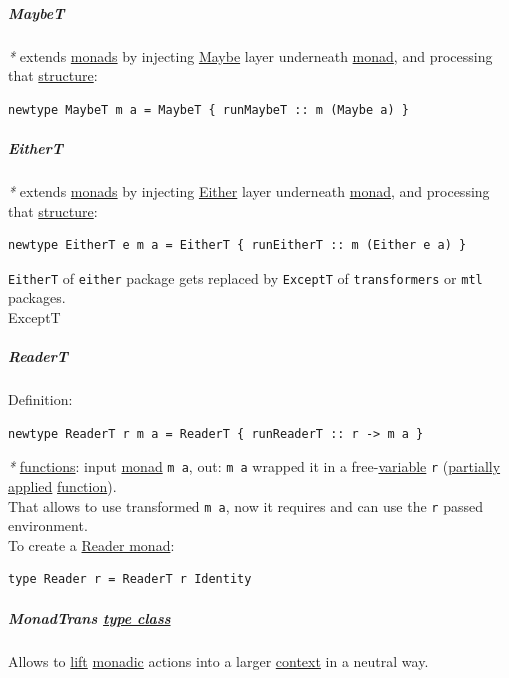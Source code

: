 \documentclass[a4paper,14pt,oneside]{book}
\begin{document}
{\subparagraph{\label{orge64d126}MaybeT}
\label{sec:orge930cc7}
\emph{*} extends \hyperref[org7e5e6f7]{monads} by injecting \hyperref[orgdc2637a]{Maybe} layer underneath \hyperref[org90c21ab]{monad}, and processing that \hyperref[org080800e]{structure}:\\
\begin{verbatim}
newtype MaybeT m a = MaybeT { runMaybeT :: m (Maybe a) }
\end{verbatim}

\subparagraph{\label{orge39884b}EitherT}
\label{sec:orga76383f}
\emph{*} extends \hyperref[org7e5e6f7]{monads} by injecting \hyperref[org25321ee]{Either} layer underneath \hyperref[org90c21ab]{monad}, and processing that \hyperref[org080800e]{structure}:\\

\begin{verbatim}
newtype EitherT e m a = EitherT { runEitherT :: m (Either e a) }
\end{verbatim}

\texttt{EitherT} of \texttt{either} package gets replaced by \texttt{ExceptT} of \texttt{transformers} or \texttt{mtl} packages.\\

\subsubparagraph{\emph{*}}
\label{sec:orga2c3408}
\label{org0832c3b}ExceptT\\

\subparagraph{\label{orgd2e8236}ReaderT}
\label{sec:org79cb9db}
Definition:\\
\begin{verbatim}
newtype ReaderT r m a = ReaderT { runReaderT :: r -> m a }
\end{verbatim}

\emph{*} \hyperref[orgf33f5fb]{functions}: input \hyperref[org90c21ab]{monad} \texttt{m a}, out: \texttt{m a} wrapped it in a free-\hyperref[org82b2aef]{variable} \texttt{r} (\hyperref[orgae8108f]{partially applied} \hyperref[org6a60524]{function}).\\
That allows to use transformed \texttt{m a}, now it requires and can use the \texttt{r} passed environment.\\

To create a \hyperref[org1a48741]{Reader monad}:\\

\begin{verbatim}
type Reader r = ReaderT r Identity
\end{verbatim}

\subparagraph{\label{orgbc4eda7}MonadTrans \hyperref[org6c8048d]{type class}}
\label{sec:org7ae3a3a}
Allows to \hyperref[orga582c5d]{lift} \hyperref[orgbea0cab]{monadic} actions into a larger \hyperref[orgae1fb98]{context} in a neutral way.\\

}
\end{document}
